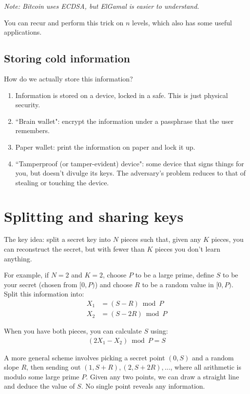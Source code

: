 \documentclass[12pt]{article}
\begin{document}
\textit{Note: Bitcoin uses ECDSA, but ElGamal is easier to understand.}

You can recur and perform this trick on $n$ levels, which also has some useful applications.

\subsection*{Storing cold information}

How do we actually store this information?
\begin{enumerate}
\item Information is stored on a device, locked in a safe. This is just physical security.
\item ``Brain wallet": encrypt the information under a passphrase that the user remembers.
\item Paper wallet: print the information on paper and lock it up.
\item ``Tamperproof (or tamper-evident) device": some device that signs things for you, but doesn't divulge its keys. The adversary's problem reduces to that of stealing or touching the device.
\end{enumerate}

\section*{Splitting and sharing keys}

The key idea: split a secret key into $N$ pieces such that, given any $K$ pieces, you can reconstruct the secret, but with fewer than $K$ pieces you don't learn anything.

For example, if $N=2$ and $K=2$, choose $P$ to be a large prime, define $S$ to be your secret (chosen from $[0, P)$) and choose $R$ to be a random value in $[0, P)$. Split this information into:
\begin{align*}
X_1 &= (S-R) \bmod P \\
X_2 &= (S-2R) \bmod P
\end{align*}

When you have both pieces, you can calculate $S$ using:
\begin{align*}
(2X_1 - X_2) \bmod P = S
\end{align*}

A more general scheme involves picking a secret point $(0, S)$ and a random slope $R$, then sending out $(1, S+R), (2, S+2R), ...$, where all arithmetic is modulo some large prime $P$. Given any two points, we can draw a straight line and deduce the value of $S$. No single point reveals any information.
\end{document}
